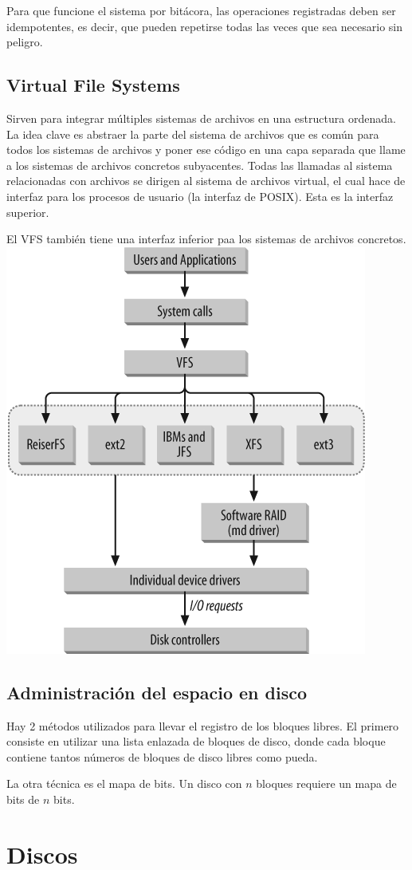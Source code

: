 Para que funcione el sistema por bitácora, las operaciones registradas deben ser idempotentes, es decir, que pueden repetirse todas las veces que sea necesario sin peligro.

\subsection{Virtual File Systems}

Sirven para integrar múltiples sistemas de archivos en una estructura ordenada. La idea clave es abstraer la parte del sistema de archivos que es común para todos los sistemas de archivos y poner ese código en una capa separada que llame a los sistemas de archivos concretos subyacentes. Todas las llamadas al sistema relacionadas con archivos se dirigen al sistema de archivos virtual, el cual hace de interfaz para los procesos de usuario (la interfaz de POSIX). Esta es la interfaz superior.

El VFS también tiene una interfaz inferior paa los sistemas de archivos concretos.
\\


\includegraphics[scale=1]{imagenes/vfs.png}


\subsection{Administración del espacio en disco}

Hay 2 métodos utilizados para llevar el registro de los bloques libres. El primero consiste en utilizar una lista enlazada de bloques de disco, donde cada bloque contiene tantos números de bloques de disco libres como pueda.

La otra técnica es el mapa de bits. Un disco con $n$ bloques requiere un mapa de bits de $n$ bits.

\newpage

\section{Discos}